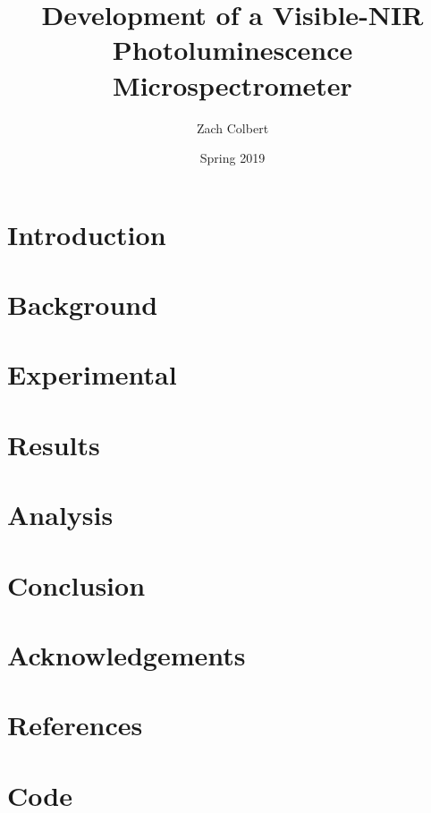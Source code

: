 \documentclass{report}
\title{Development of a Visible-NIR Photoluminescence Microspectrometer}
\author{Zach Colbert}
\date{Spring 2019}
\renewenvironment{abstract}
 {%
  \global\setbox\abstractbox=\vtop\bgroup
  \begin{center}\bfseries\abstractname\end{center}%
 }
 {\par\egroup}
\begin{document}


  \tableofcontents


  \chapter{Introduction}
  

  \chapter{Background}
  

  \chapter{Experimental}
  

  \chapter{Results}
  

  \chapter{Analysis}

  \chapter{Conclusion}

  \chapter*{Acknowledgements}

  \chapter*{References}


  \appendix
  \chapter{Code}
\end{document}
